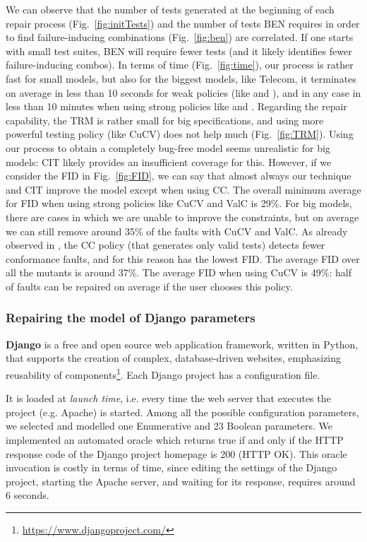 \begin{tikzborder}{\cite{Gargantini16:validation}}
\begin{tikzborder}{\cite{gargantini_combinatorial_2017}}
\begin{tikzborder}{\cite{gargantini_combinatorial_2017}}
We can observe that the number of tests generated at the beginning of each repair process (Fig.~\ref{fig:initTests}) and the number of tests BEN requires in order to find failure-inducing combinations (Fig.~\ref{fig:ben}) are correlated.  If one starts with small test suites, BEN will require fewer tests (and it likely identifies fewer failure-inducing combos).  In terms of time (Fig.~\ref{fig:time}), our process is rather fast for small models, but also for the biggest models, like Telecom, it terminates on average in less than 10 seconds for weak policies (like \ic and \ccit), and in any case in less than 10 minutes when using strong policies like \cucv and \ValC.
Regarding the repair capability, the TRM is rather small for big specifications, and using more powerful testing policy (like CuCV) does not help much (Fig.~\ref{fig:TRM}). Using our process to obtain a completely bug-free model seems unrealistic for big models: CIT likely provides an insufficient coverage for this. 
However, if we consider  the FID in Fig.~\ref{fig:FID}, we can say that almost always our technique and CIT improve the model except when using CC. The overall minimum average for FID when using strong policies like CuCV and ValC is 29\%. For big models, there are cases in which we are unable to improve the constraints, but on average we can still remove around 35\% of the faults with CuCV and ValC. As already observed in \cite{Gargantini16:validation}, the CC policy (that generates only valid tests) detects fewer conformance faults, and for this reason has the lowest FID. The average FID over all the mutants is around 37\%. The average FID when using CuCV is 49\%: half of faults can be repaired on average if the user chooses this policy.\be

\subsubsection{Repairing the model of Django parameters}

\bb \textbf{Django} is a free and open source web application framework, written in Python, that supports the creation of complex, database-driven websites, emphasizing reusability of components\footnote{\url{https://www.djangoproject.com/}}. Each Django project has a configuration file. 

\noindent It is loaded at \emph{launch time}, i.e. every time the web server that executes the project (e.g. Apache) is started.
Among all the possible configuration parameters, we selected and modelled one Enumerative and 23 Boolean parameters. We implemented an automated oracle which returns true if and only if the HTTP response code of the Django project homepage is 200 (HTTP OK). This oracle invocation is costly in terms of time, since editing the settings of the Django project, starting the Apache server, and waiting for its response, requires around 6 seconds.


\end{tikzborder}
\end{tikzborder}
\end{tikzborder}
